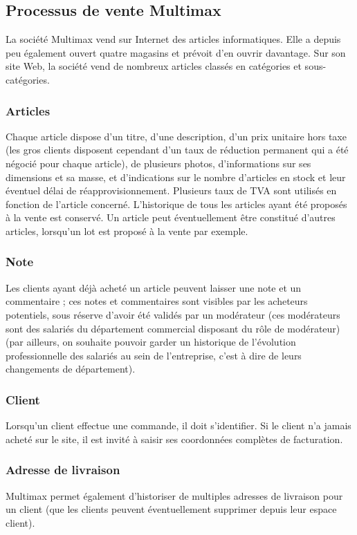 \documentclass[a4paper,12pt]{article}
\author{Easylia}
\begin{document}
\subsection*{Processus de vente Multimax}
La société Multimax vend sur Internet des articles informatiques. Elle a depuis peu également ouvert quatre magasins et prévoit d'en ouvrir davantage. 
Sur son site Web, la société vend de nombreux articles classés en catégories et sous-catégories.
\subsubsection*{Articles}
Chaque article dispose d'un titre, d'une description, d'un prix unitaire hors taxe (les gros clients disposent cependant d'un taux de réduction permanent qui a été négocié pour chaque article), de plusieurs photos, d'informations sur ses dimensions et sa masse, et d'indications sur le nombre d'articles en stock et leur éventuel délai de réapprovisionnement.
Plusieurs taux de TVA sont utilisés en fonction de l'article concerné.
L'historique de tous les articles ayant été proposés à la vente est conservé.
Un article peut éventuellement être constitué d'autres articles, lorsqu'un lot est proposé à la vente par exemple.
\subsubsection*{Note}
Les clients ayant déjà acheté un article peuvent laisser une note et un commentaire ;
ces notes et commentaires sont visibles par les acheteurs potentiels, sous réserve d'avoir été validés par un modérateur (ces modérateurs sont des salariés du département commercial disposant du rôle de modérateur)
(par ailleurs, on souhaite pouvoir garder un historique de l'évolution professionnelle des salariés au sein de l'entreprise, c'est à dire de leurs changements de département).
\subsubsection*{Client}
Lorsqu'un client effectue une commande, il doit s'identifier. Si le client n'a jamais acheté sur le site, il est invité à saisir ses coordonnées complètes de facturation.
\subsubsection*{Adresse de livraison}
Multimax permet également d'historiser de multiples adresses de livraison pour un client (que les clients peuvent éventuellement supprimer depuis leur espace client).
\end{document}
